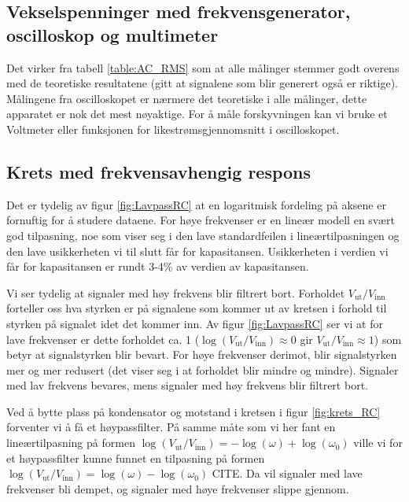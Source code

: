 \documentclass[reprint, english,notitlepage]{revtex4-1}  %
\begin{document}
\subsection{Vekselspenninger med frekvensgenerator, oscilloskop og multimeter}

Det virker fra tabell \ref{table:AC_RMS} som at alle målinger stemmer godt overens med de teoretiske resultatene (gitt at signalene som blir generert også er riktige). Målingene fra oscilloskopet er nærmere det teoretiske i alle målinger, dette apparatet er nok det mest nøyaktige. For å måle forskyvningen kan vi bruke et Voltmeter eller funksjonen for likestrømsgjennomsnitt i oscilloskopet.


\subsection{Krets med frekvensavhengig respons}

Det er tydelig av figur \ref{fig:LavpassRC} at en logaritmisk fordeling på aksene er fornuftig for å studere dataene. For høye frekvenser er en lineær modell en svært god tilpasning, noe som viser seg i den lave standardfeilen i lineærtilpasningen og den lave usikkerheten vi til slutt får for kapasitansen. Usikkerheten i verdien vi får for kapasitansen er rundt 3-4\% av verdien av kapasitansen.

Vi ser tydelig at signaler med høy frekvens blir filtrert bort. Forholdet $V_{\text{ut}}/V_{\text{inn}}$ forteller oss hva styrken er på signalene som kommer ut av kretsen i forhold til styrken på signalet idet det kommer inn. Av figur \ref{fig:LavpassRC} ser vi at for lave frekvenser er dette forholdet ca. 1 ($\log (V_{\text{ut}}/V_{\text{inn}}) \approx 0$ gir $V_{\text{ut}}/V_{\text{inn}} \approx 1$) som betyr at signalstyrken blir bevart. For høye frekvenser derimot, blir signalstyrken mer og mer redusert (det viser seg i at forholdet blir mindre og mindre). Signaler med lav frekvens bevares, mens signaler med høy frekvens blir filtrert bort.

Ved å bytte plass på kondensator og motstand i kretsen i figur \ref{fig:krets_RC} forventer vi å få et høypassfilter. På samme måte som vi her fant en lineærtilpasning på formen $\log ( V_{\text{ut}}/V_{\text{inn}}) = -\log (\omega) + \log (\omega_0)$ ville vi for et høypassfilter kunne funnet en tilpasning på formen $\log ( V_{\text{ut}}/V_{\text{inn}}) = \log (\omega) - \log (\omega_0)$ CITE. Da vil signaler med lave frekvenser bli dempet, og signaler med høye frekvenser slippe gjennom.
\end{document}
